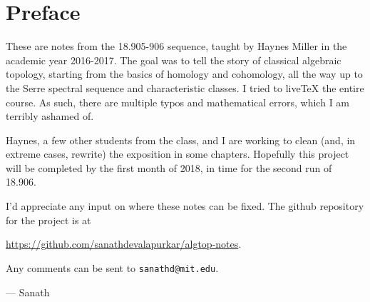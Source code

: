 \cleardoublepage
\section*{Preface}
These are notes from the 18.905-906 sequence, taught by Haynes Miller in the
academic year 2016-2017. The goal was to tell the story of classical algebraic
topology, starting from the basics of homology and cohomology, all the way up
to the Serre spectral sequence and characteristic classes. I tried to live\TeX
the entire course. As such, there are multiple typos and mathematical errors,
which I am terribly ashamed of.

Haynes, a few other students from the class, and I are working to clean (and,
in extreme cases, rewrite) the exposition in some chapters. Hopefully this
project will be completed by the first month of 2018, in time for the second
run of 18.906.

I'd appreciate any input on where these notes can be fixed. The github
repository for the project is at
\begin{center}
    \url{https://github.com/sanathdevalapurkar/algtop-notes}.
\end{center}
Any comments can be sent to \verb|sanathd@mit.edu|.

--- Sanath

\newpage


